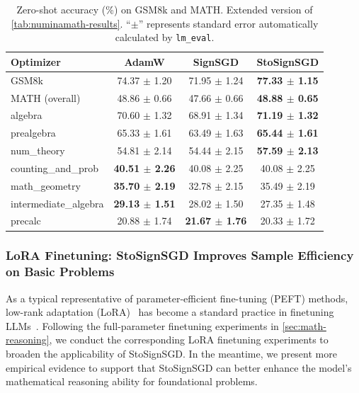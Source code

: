 \documentclass{article}
\begin{document}
\begin{table}[htbp]
    \centering
    \caption{Zero-shot accuracy (\%) on GSM8k and MATH. Extended version of \cref{tab:numinamath-results}. ``$\pm$'' represents standard error automatically calculated by \texttt{lm\_eval}.}
    \label{tab:math-subcategory-results}
    \begin{tabular}{lccc}
        \toprule
        \textbf{Optimizer} & \textbf{AdamW} &\textbf{SignSGD} &  \textbf{StoSignSGD} \\
        \midrule
        GSM8k & 74.37 \(\pm\) 1.20 & 71.95 \(\pm\) 1.24 & \textbf{77.33 \(\pm\) 1.15} \\\midrule
        MATH (overall)    &48.86 \(\pm\) 0.66   & 47.66 \(\pm\) 0.66&\textbf{48.88 \(\pm\) 0.65}  \\\midrule
        algebra         & 70.60 $\pm$ 1.32 & 68.91 $\pm$ 1.34 & \textbf{71.19 $\pm$ 1.32}  \\
        prealgebra  & 65.33 $\pm$ 1.61 & 63.49 $\pm$ 1.63 & \textbf{65.44 $\pm$ 1.61}  \\
        num\_theory & 54.81 $\pm$ 2.14 & 54.44 $\pm$ 2.15 & \textbf{57.59 $\pm$ 2.13} \\
        counting\_and\_prob     & \textbf{40.51 $\pm$ 2.26} & 40.08 $\pm$ 2.25 & 40.08 $\pm$ 2.25 \\
        math\_geometry    & \textbf{35.70 $\pm$ 2.19} & 32.78 $\pm$ 2.15 & 35.49 $\pm$ 2.19 \\
        intermediate\_algebra    & \textbf{29.13 $\pm$ 1.51} & 28.02 $\pm$ 1.50 & 27.35 $\pm$ 1.48 \\
        precalc & 20.88 $\pm$ 1.74 & \textbf{21.67 $\pm$ 1.76}& 20.33 $\pm$ 1.72\\
        \bottomrule
    \end{tabular}
\end{table}

\subsubsection{LoRA Finetuning: StoSignSGD Improves Sample Efficiency on Basic Problems\label{sec:lora}}

As a typical representative of parameter-efficient fine-tuning (PEFT) methods, low-rank adaptation (LoRA)~\citep{hu2022lora} has become a standard practice in finetuning LLMs~\citep{zheng-etal-2024-llamafactory,diao2024lmflow}. Following the full-parameter finetuning experiments in \cref{sec:math-reasoning}, we conduct the corresponding LoRA finetuning experiments to broaden the applicability of StoSignSGD. In the meantime, we present more empirical evidence to support that StoSignSGD can better enhance the model's mathematical reasoning ability for foundational problems.
\end{document}
